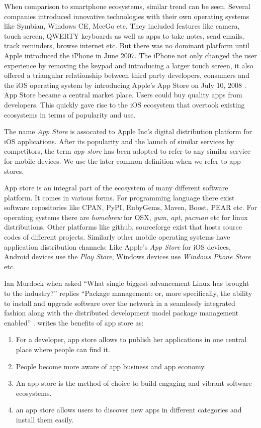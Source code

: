 When comparison to smartphone ecosystems, similar trend can be seen. Several companies introduced innovative technologies with their own operating systems like Symbian, Windows CE, MeeGo etc. They included features like camera, touch screen, QWERTY keyboards as well as apps to take notes, send emails, track reminders, browse internet etc. But there was no dominant platform until Apple introduced the iPhone in June 2007. The iPhone not only changed the user experience by removing the keypad and introducing a larger touch screen, it also offered a triangular relationship between third party developers, consumers and the iOS operating system by introducing Apple's App Store on July 10, 2008 \cite{wiki:AppStore_iOS}. App Store became a central market place. Users could buy quality apps from developers. This quickly gave rise to the iOS ecosystem that overtook existing ecosystems in terms of popularity and use.

The name \emph{App Store} is assocated to Apple Inc's digital distribution platform for iOS applications. After its popularity and the launch of similar services by competitors, the term \emph{app store} has been adopted to refer to any similar service for mobile devices. We use the later common definition when we refer to app stores. 

App store is an integral part of the ecosystem of many different software platform. It comes in various forms. For programming language there exist software repositories like CPAN, PyPI, RubyGems, Maven, Boost, PEAR etc. For operating systems there are \textit{homebrew} for OSX, \textit{yum}, \textit{apt}, \textit{pacman} etc for linux distributions. Other platforms like github, sourceforge exist that hosts source codes of different projects. Similarly other mobile operating systems have application distribution channels: Like Apple's \emph{App Store} for iOS devices, Android devices use the \textit{Play Store}, Windows devices use \emph{Windows Phone Store} etc.

Ian Murdock when asked ``What single biggest advancement Linux has brought to the industry?'' replies ``Package management: or, more specifically, the ability to install and upgrade software over the network in a seamlessly integrated fashion along with the distributed development model package management enabled'' \cite{murdock_how_package_management}. \cite{Jansen} writes the benefits of app store as:

\begin{enumerate}
  \item For a developer, app store allows to publish her applications in one central place where people can find it.
  \item People become more aware of app business and app economy.
  \item An app store is the method of choice to build engaging and vibrant software ecosystems.
  \item an app store allows users to discover new apps in different categories and install them easily.
\end{enumerate}

